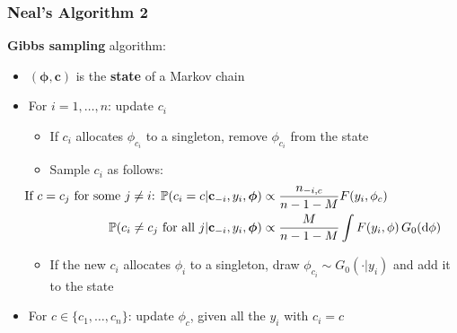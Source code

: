 \begin{frame} %
	\frametitle{Neal's Algorithm 2}
	\textbf{Gibbs sampling} algorithm:
	\begin{itemize}
		\item $(\boldsymbol\phi, \mathbf c)$ is the \textbf{state} of a Markov chain
	    \item For $i= 1,\dots,n$: update $c_{i}$
	    \begin{itemize}
	        \item If $c_{i}$ allocates $\phi_{c_i}$ to a singleton, remove $\phi_{c_{i}}$ from the state
		    \item Sample $c_i$ as follows:
	        \begin{align*}
		        \hspace{-35pt}
                \text{If $c=c_j$ for some $j\neq i$: } \PP(c_{i}=c | \mathbf c_{-i}, y_{i},\boldsymbol\phi) &\propto \frac{n_{-i,c}}{n-1-M} F(y_{i},\phi_{c}) \\
                \PP(c_{i}\neq c_{j} \text{ for all } j | \mathbf c_{-i}, y_{i},\boldsymbol\phi) &\propto \frac{M }{n-1-M} \int F(y_{i},\phi) \, G_0(\de\phi)
            \end{align*}
            \item If the new $c_{i}$ allocates $\phi_i$ to a singleton, draw $\phi_{c_{i}} \sim G_0(\cdot|y_i)$ and add it to the state
        \end{itemize} 
        
       	\item For $c \in \{c_{1},\dots,c_{n}\}$: update $\phi_{c}$, given all the $y_{i}$ with $c_{i}=c$
	\end{itemize}
		
\end{frame}




